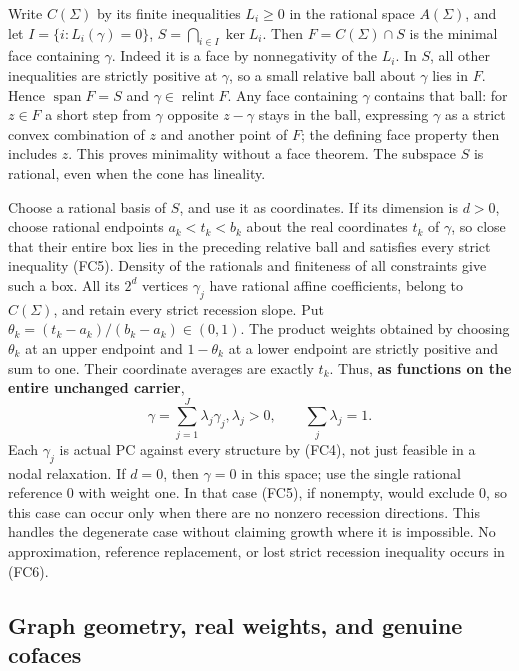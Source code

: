\documentclass[
  11pt,
]{article}
\begin{document}
Write \(C(\Sigma)\) by its finite inequalities \(L_i\geq0\) in the
rational space \(A(\Sigma)\), and let \(I=\{i:L_i(\gamma)=0\}\),
\(S=\bigcap_{i\in I}\ker L_i\). Then \(F=C(\Sigma)\cap S\) is the
minimal face containing \(\gamma\). Indeed it is a face by nonnegativity
of the \(L_i\). In \(S\), all other inequalities are strictly positive
at \(\gamma\), so a small relative ball about \(\gamma\) lies in \(F\).
Hence \(\operatorname{span}F=S\) and
\(\gamma\in\operatorname{relint}F\). Any face containing \(\gamma\)
contains that ball: for \(z\in F\) a short step from \(\gamma\) opposite
\(z-\gamma\) stays in the ball, expressing \(\gamma\) as a strict convex
combination of \(z\) and another point of \(F\); the defining face
property then includes \(z\). This proves minimality without a face
theorem. The subspace \(S\) is rational, even when the cone has
lineality.

Choose a rational basis of \(S\), and use it as coordinates. If its
dimension is \(d>0\), choose rational endpoints \(a_k<t_k<b_k\) about
the real coordinates \(t_k\) of \(\gamma\), so close that their entire
box lies in the preceding relative ball and satisfies every strict
inequality (FC5). Density of the rationals and finiteness of all
constraints give such a box. All its \(2^d\) vertices \(\gamma_j\) have
rational affine coefficients, belong to \(C(\Sigma)\), and retain every
strict recession slope. Put \(\theta_k=(t_k-a_k)/(b_k-a_k)\in(0,1)\).
The product weights obtained by choosing \(\theta_k\) at an upper
endpoint and \(1-\theta_k\) at a lower endpoint are strictly positive
and sum to one. Their coordinate averages are exactly \(t_k\). Thus,
\textbf{as functions on the entire unchanged carrier}, \[
                 \gamma=\sum_{j=1}^{J}\lambda_j\gamma_j,
                 \lambda_j>0,\qquad\sum_j\lambda_j=1.        \tag{FC6}
\] Each \(\gamma_j\) is actual PC against every structure by (FC4), not
just feasible in a nodal relaxation. If \(d=0\), then \(\gamma=0\) in
this space; use the single rational reference \(0\) with weight one. In
that case (FC5), if nonempty, would exclude \(0\), so this case can
occur only when there are no nonzero recession directions. This handles
the degenerate case without claiming growth where it is impossible. No
approximation, reference replacement, or lost strict recession
inequality occurs in (FC6).

\subsection{Graph geometry, real weights, and genuine
cofaces}\label{graph-geometry-real-weights-and-genuine-cofaces}
\end{document}
